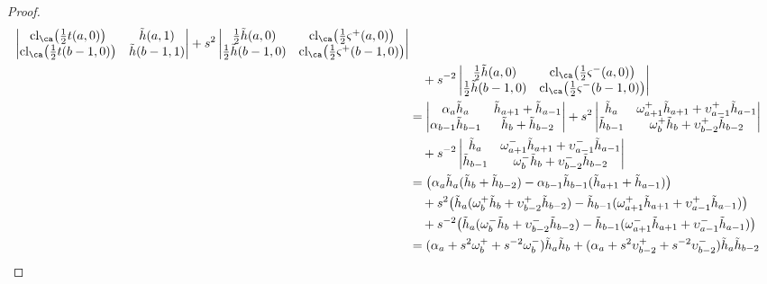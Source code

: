 \begin{proof}
\begin{align*}
\begin{vmatrix}
\cl_\ca \big( \frac{1}{2} t(a,0) \big) & \tilde{h}(a,1) \\
\cl_\ca \big( \frac{1}{2} t(b-1,0) \big) & \tilde{h}(b-1,1)
\end{vmatrix}
+ s^2
\begin{vmatrix}
\frac{1}{2}\tilde{h}(a,0) & \cl_\ca \big( \frac{1}{2} \varsigma^+(a,0) \big) \\
\frac{1}{2}\tilde{h}(b-1,0) & \cl_\ca \big( \frac{1}{2} \varsigma^+(b-1,0) \big)
\end{vmatrix} \\
& \quad + s^{-2}
\begin{vmatrix}
\frac{1}{2}\tilde{h}(a,0) & \cl_\ca \big( \frac{1}{2} \varsigma^-(a,0) \big) \\
\frac{1}{2}\tilde{h}(b-1,0) & \cl_\ca \big( \frac{1}{2} \varsigma^-(b-1,0) \big)
\end{vmatrix} \\
&=
\begin{vmatrix}
\alpha_a \tilde{h}_a & \tilde{h}_{a+1} + \tilde{h}_{a-1} \\
\alpha_{b-1} \tilde{h}_{b-1} & \tilde{h}_{b} + \tilde{h}_{b-2}
\end{vmatrix}
+ s^2
\begin{vmatrix}
\tilde{h}_a & \omega_{a+1}^+ \tilde{h}_{a+1} + \upsilon^+_{a-1} \tilde{h}_{a-1} \\
\tilde{h}_{b-1} & \omega_{b}^+ \tilde{h}_{b} + \upsilon^+_{b-2} \tilde{h}_{b-2}
\end{vmatrix} \\
& \quad + s^{-2}
\begin{vmatrix}
\tilde{h}_a & \omega_{a+1}^- \tilde{h}_{a+1} + \upsilon^-_{a-1} \tilde{h}_{a-1} \\
\tilde{h}_{b-1} & \omega_{b}^- \tilde{h}_{b} + \upsilon^-_{b-2} \tilde{h}_{b-2}
\end{vmatrix} \\
&= \big( \alpha_a \tilde{h}_a (\tilde{h}_{b} + \tilde{h}_{b-2}) - \alpha_{b-1} \tilde{h}_{b-1} (\tilde{h}_{a+1} + \tilde{h}_{a-1}) \big) \\
& \quad + s^2 \big( \tilde{h}_a (\omega_{b}^+ \tilde{h}_{b} + \upsilon^+_{b-2} \tilde{h}_{b-2}) - \tilde{h}_{b-1}( \omega_{a+1}^+\tilde{h}_{a+1} + \upsilon^+_{a-1} \tilde{h}_{a-1}) \big) \\
& \quad + s^{-2} \big( \tilde{h}_a (\omega_{b}^- \tilde{h}_{b} + \upsilon^-_{b-2} \tilde{h}_{b-2}) - \tilde{h}_{b-1} (\omega_{a+1}^- \tilde{h}_{a+1} + \upsilon^-_{a-1} \tilde{h}_{a-1}) \big) \\
&= (\alpha_a + s^2 \omega_b^+ + s^{-2} \omega_b^-) \tilde{h}_a \tilde{h}_b + (\alpha_a + s^2 \upsilon_{b-2}^+ + s^{-2} \upsilon_{b-2}^-) \tilde{h}_a \tilde{h}_{b-2} \\

\end{align*}
\end{proof}
